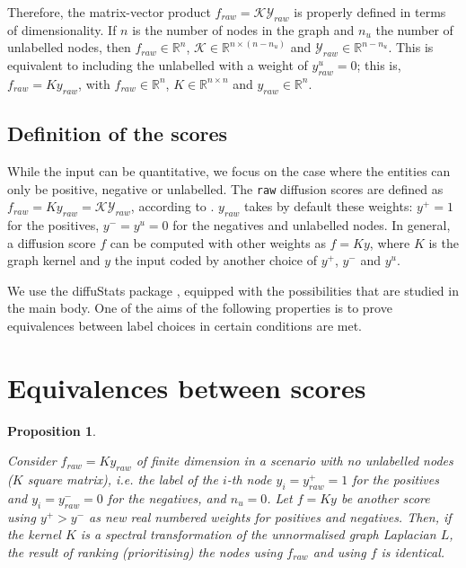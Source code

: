 \documentclass[12pt]{article}  %
\newtheorem{property}{Proposition}
\begin{document}
Therefore, the matrix-vector product $ f_{raw} = \mathcal{K} \mathcal{Y}_{raw} $ is properly defined in terms of dimensionality. 
If $n$ is the number of nodes in the graph and $n_{u}$ the number of unlabelled nodes, then $f_{raw} \in \mathds{R}^{n} $, $\mathcal{K} \in \mathds{R}^{n \times (n - n_u)}$ and $\mathcal{Y}_{raw} \in \mathds{R}^{n - n_u}$. 
This is equivalent to including the unlabelled with a weight of $y_{raw}^u = 0$; this is, $ f_{raw} = K y_{raw} $, with $f_{raw} \in \mathds{R}^{n} $, $K \in \mathds{R}^{n \times n}$ and $y_{raw} \in \mathds{R}^{n}$.

\subsection*{Definition of the scores}

While the input can be quantitative, we focus on the case where the entities can only be positive, negative or unlabelled. 
The \texttt{raw} diffusion scores are defined as $ f_{raw} = K y_{raw} = \mathcal{K} \mathcal{Y}_{raw}$, according to \cite{picart2017diffustats}. 
$y_{raw}$ takes by default these weights: $y^+ = 1$ for the positives, $y^- = y^u = 0$ for the negatives and unlabelled nodes.
In general, a diffusion score $f$ can be computed with other weights as $f = Ky$, where $K$ is the graph kernel and $y$ the input coded by another choice of $y^+$, $y^-$ and $y^u$. 

We use the diffuStats package \cite{picart2017diffustats}, equipped with the possibilities that are studied in the main body. 
One of the aims of the following properties is to prove equivalences between label choices in certain conditions are met. 

\clearpage
\section*{Equivalences between scores}

\begin{property}\label{prop:rawlabel}

Consider $f_{raw} = K y_{raw}$ of finite dimension in a scenario with no unlabelled nodes ($K$ square matrix), i.e. the label of the $i$-th node $y_i = y_{raw}^+ = 1$ for the positives and $y_i = y_{raw}^- = 0$ for the negatives, and $n_u = 0$. 
Let $f = Ky$ be another score using $y^{+} > y^{-}$ as new real numbered weights for positives and negatives.
Then, if the kernel $K$ is a spectral transformation of the unnormalised graph Laplacian $L$, the result of ranking (prioritising) the nodes using $f_{raw}$ and using $f$ is identical. 

\end{property}
\end{document}

